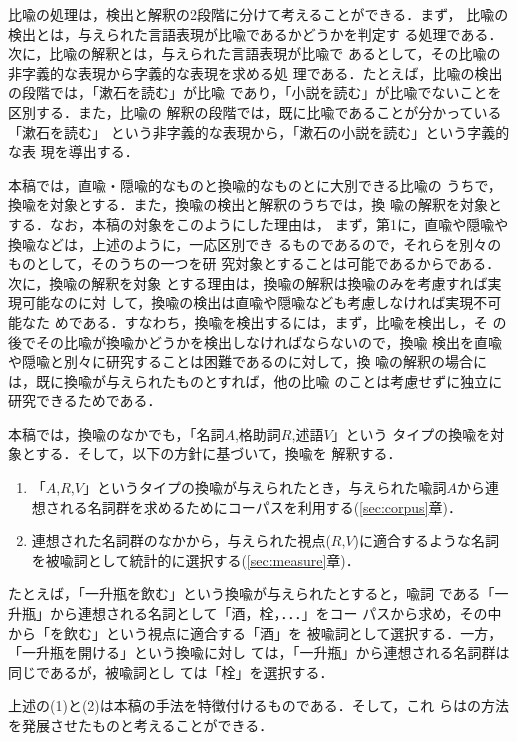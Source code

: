 比喩の処理は，検出と解釈の2段階に分けて考えることができる．まず，
比喩の検出とは，与えられた言語表現が比喩であるかどうかを判定す
る処理である．次に，比喩の解釈とは，与えられた言語表現が比喩で
あるとして，その比喩の非字義的な表現から字義的な表現を求める処
理である．たとえば，比喩の検出の段階では，「漱石を読む」が比喩
であり，「小説を読む」が比喩でないことを区別する．また，比喩の
解釈の段階では，既に比喩であることが分かっている「漱石を読む」
という非字義的な表現から，「漱石の小説を読む」という字義的な表
現を導出する．

本稿では，直喩・隠喩的なものと換喩的なものとに大別できる比喩の
うちで，換喩を対象とする．また，換喩の検出と解釈のうちでは，換
喩の解釈を対象とする．なお，本稿の対象をこのようにした理由は，
まず，第1に，直喩や隠喩や換喩などは，上述のように，一応区別でき
るものであるので，それらを別々のものとして，そのうちの一つを研
究対象とすることは可能であるからである．次に，換喩の解釈を対象
とする理由は，換喩の解釈は換喩のみを考慮すれば実現可能なのに対
して，換喩の検出は直喩や隠喩なども考慮しなければ実現不可能なた
めである．すなわち，換喩を検出するには，まず，比喩を検出し，そ
の後でその比喩が換喩かどうかを検出しなければならないので，換喩
検出を直喩や隠喩と別々に研究することは困難であるのに対して，換
喩の解釈の場合には，既に換喩が与えられたものとすれば，他の比喩
のことは考慮せずに独立に研究できるためである．

本稿では，換喩のなかでも，「$名詞A$,$格助詞R$,$述語V$」という
タイプの換喩を対象とする．そして，以下の方針に基づいて，換喩を
解釈する．
\begin{enumerate}
 \item 「$A$,$R$,$V$」というタイプの換喩が与えられたとき，与えられた喩詞$A$から連想される名詞群を求めるためにコーパスを利用する(\ref{sec:corpus}章)．
 \item 連想された名詞群のなかから，与えられた視点($R$,$V$)に適合するような名詞を被喩詞として統計的に選択する(\ref{sec:measure}章)．
\end{enumerate}

たとえば，「一升瓶を飲む」という換喩が与えられたとすると，喩詞
である「一升瓶」から連想される名詞として「酒，栓，．．．」をコー
パスから求め，その中から「を飲む」という視点に適合する「酒」を
被喩詞として選択する．一方，「一升瓶を開ける」という換喩に対し
ては，「一升瓶」から連想される名詞群は同じであるが，被喩詞とし
ては「栓」を選択する．

上述の(1)と(2)は本稿の手法を特徴付けるものである．そして，これ
らは\cite{yamamoto98}の方法を発展させたものと考えることができる．

